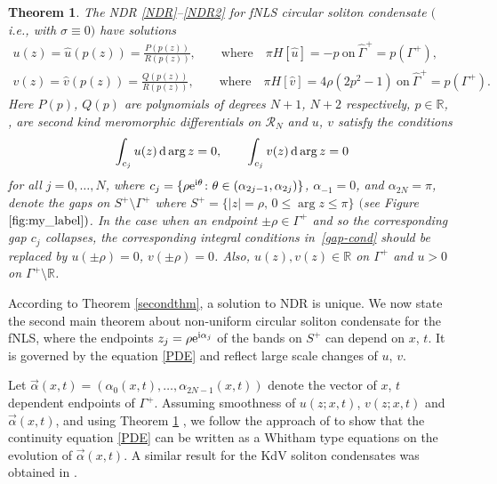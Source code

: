 \documentclass[pdftex]{sigma}
\numberwithin{equation}{section}
\newtheorem{Theorem}{Theorem}[section]
\newcommand{\G}{\Gamma}
\def\R{{\mathbb R}}
\def\a{\alpha}
\def\G{\Gamma}
\begin{document}
\begin{Theorem}\label{th-main-1}
The NDR \eqref{NDR}--\eqref{NDR2} for fNLS circular soliton condensate $($i.e., with $\sigma\equiv 0)$ have solutions
\begin{gather}%
u(z)= \hat u(p(z))= \frac{P(p(z))}{ R(p(z))}, \qquad \text{where} \quad \pi H[\hat u]=-p \ \text{on}\ \hat\G^+=p(\G^+),\nonumber\\
v(z)= \hat v(p(z))=\frac{ Q(p(z))}{ R(p(z))},\qquad \text{where} \quad \pi H[\hat v]=4\rho(2p^2-1)
\ \text{on}\ \hat\G^+=p(\G^+). \label{NDRinMain2}
\end{gather}
Here $P(p)$, $Q(p)$ are polynomials of degrees $N+1$, $N+2$ respectively, $p\in\R$, ,  are
second kind meromorphic differentials on $\mathcal{R}_N$ and
$u$, $v$ satisfy the conditions
\begin{gather} \label{gap-cond}
\int_{c_j} u(z)\,{\rm d}\arg z=0, \qquad
\int_{c_j} v(z)\,{\rm d}\arg z=0
\end{gather}
for all
$j=0,\dots,N$, where $c_j=\{\rho {\rm e}^{{\rm i}\theta}\colon \theta\in (\alpha_{2j-1},\alpha_{2j})\}$, $\alpha_{-1}=0$, and $\alpha_{2N}=\pi$, denote the gaps on $S^+\setminus \G^+$ where
$S^+=\{|z|=\rho,\, 0\leq \arg z\leq \pi\}$ $($see Figure~$\ref{fig:my_label})$. In the case when an endpoint $\pm\rho\in\G^+$ and so the corresponding gap $c_j$ collapses, the corresponding integral conditions in~\eqref{gap-cond} should be replaced by $u(\pm\rho)=0$,
$v(\pm\rho)=0$. Also, $u(z),v(z)\in\R$ on $\G^+$ and $u>0$ on $\G^+\setminus\R$.
\end{Theorem}

According to Theorem \ref{secondthm}, a solution to NDR is unique.
We now state the second main theorem about non-uniform circular soliton condensate for the fNLS,
where the endpoints ${z_j=\rho {\rm e}^{{\rm i}\a_j}}$ of the bands on $S^+$ can depend on $x$, $t$.
It is governed by the equation \eqref{PDE}
and reflect large scale changes of $u$, $v$.

Let $\vec \a(x,t)=(\a_0(x,t),\dots,\a_{2N-1}(x,t))$ denote the vector of $x$, $t$ dependent endpoints of $\G^+$. Assuming smoothness of $u(z;x,t)$, $v(z;x,t)$ and
$\vec \a(x,t)$, and using Theorem \ref{th-main-1} , we follow the approach of \cite{FFM} to show that
the continuity equation \eqref{PDE} can be written as a Whitham type equations on the evolution of $\vec \a(x,t)$. A similar result for the KdV soliton condensates was obtained in \cite{CERT}.
\end{document}
